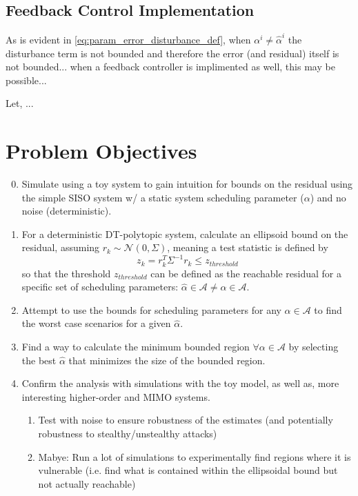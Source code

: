 \documentclass[]{article}
\begin{document}
\subsection{Feedback Control Implementation}
As is evident in \eqref{eq:param_error_disturbance_def}, when $\alpha^i \neq \hat{\alpha}^i$ the disturbance term is not bounded and therefore the error (and residual) itself is not bounded... when a feedback controller is implimented as well, this may be possible...

Let, ...



\newpage
\section{Problem Objectives}
\begin{enumerate}
	\setcounter{enumi}{-1} %
	\item Simulate using a toy system to gain intuition for bounds on the residual using the simple SISO system w/ a static system scheduling parameter (${\alpha}$) and no noise (deterministic).
	\item For a deterministic DT-polytopic system, calculate an ellipsoid bound on the residual, assuming $r_k \sim \mathcal{N}(0,\Sigma)$, meaning a test statistic is defined by
	$$z_k = r_k^T \Sigma^{-1} r_k \leq z_{threshold}$$
	so that the threshold $z_{threshold}$ can be defined as the reachable residual for a specific set of scheduling parameters: $\hat{\alpha} \in \mathcal{A} \neq {\alpha} \in \mathcal{A}$.
	\item Attempt to use the bounds for scheduling parameters for any ${\alpha}\in \mathcal{A}$ to find the worst case scenarios for a given $\hat{\alpha}$.
	\item Find a way to calculate the minimum bounded region $\forall {\alpha} \in \mathcal{A}$ by selecting the best $\hat{\alpha}$ that minimizes the size of the bounded region.
	\item Confirm the analysis with simulations with the toy model, as well as, more interesting higher-order and MIMO systems.
	\begin{enumerate}
		\item Test with noise to ensure robustness of the estimates (and potentially robustness to stealthy/unstealthy attacks)
		\item Mabye: Run a lot of simulations to experimentally find regions where it is vulnerable (i.e. find what is contained within the ellipsoidal bound but not actually reachable)
	\end{enumerate}
\end{enumerate}
\end{document}
